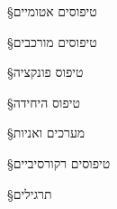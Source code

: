 §טיפוסים אטומיים

§טיפוסים מורכבים

§טיפוס פונקציה

§טיפוס היחידה

§מערכים ואניות

§טיפוסים רקורסיביים

§תרגילים

